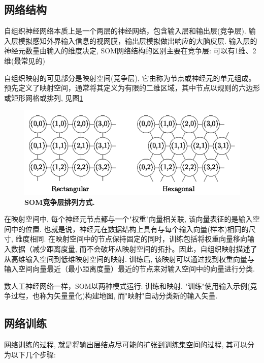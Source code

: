 \subsection{网络结构}

自组织神经网络本质上是一个两层的神经网络，包含输入层和输出层(竞争层). 输入层模拟感知外界输入信息的视网膜，输出层模拟做出响应的大脑皮层. 输入层的神经元数量由输入的维度决定, SOM网络结构的区别主要在竞争层: 可以有1维、2维(最常见的)

自组织映射的可见部分是映射空间(竞争层), 它由称为节点或神经元的单元组成。预先定义了映射空间，通常将其定义为有限的二维区域，其中节点以规则的六边形或矩形网格或排列, 见图\ref{fig:som2} 
\begin{figure}[h]
    \begin{center}
        \includegraphics[width=0.6\linewidth]{fig/som2}
    \end{center}
    \caption{\textbf{SOM竞争层排列方式.} }
        \label{fig:som2}
  \end{figure}

在映射空间中, 每个神经元节点都与一个"权重"向量相关联, 该向量表征的是输入空间中的位置. 也就是说，神经元在数据结构上具有与每个输入向量(样本)相同的尺寸, 维度相同. 在映射空间中的节点保持固定的同时，训练包括将权重向量移向输入数据（减少距离度量, 而不会破坏从映射空间的拓扑。因此，自组织映射描述了从高维输入空间到低维映射空间的映射.
训练后, 该映射可以通过找到权重向量与输入空间向量最近（最小距离度量）最近的节点来对输入空间中的向量进行分类.%

数人工神经网络一样，SOM以两种模式运行: 训练和映射. "训练"使用输入示例(竞争过程，也称为矢量量化)构建地图, 而"映射"自动分类新的输入矢量.

\subsection{网络训练}

网络训练的过程, 就是将输出层结点尽可能的扩张到训练集空间的过程, 其可以分为以下几个步骤:


